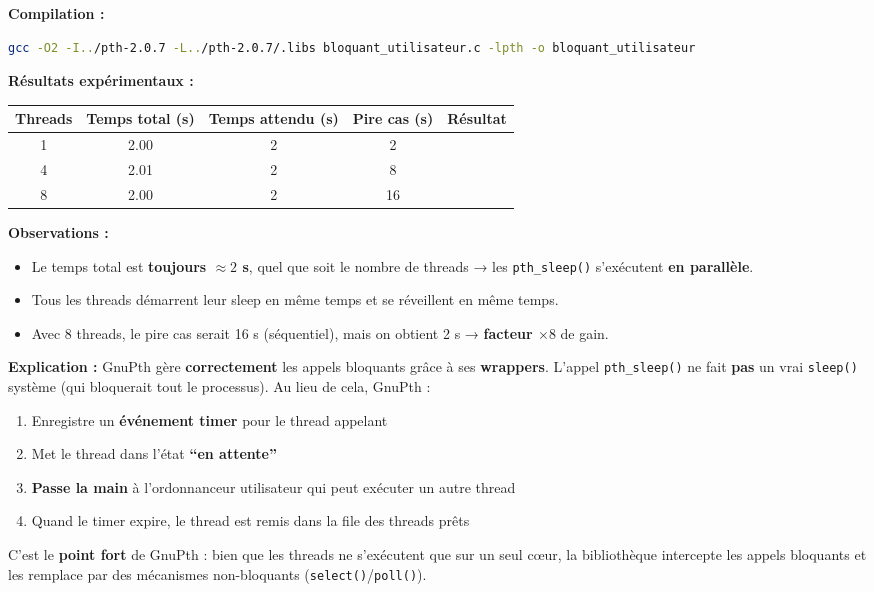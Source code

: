 \documentclass[11pt,a4paper]{article}
\newcommand{\cmark}{\ding{51}}
\let\oldtexttt\texttt
\renewcommand{\texttt}[1]{\oldtexttt{\color{keyword}#1}}
\begin{document}
\textbf{Compilation :}
\begin{lstlisting}[language=bash]
gcc -O2 -I../pth-2.0.7 -L../pth-2.0.7/.libs bloquant_utilisateur.c -lpth -o bloquant_utilisateur
\end{lstlisting}

\textbf{Résultats expérimentaux :}
\begin{center}
\begin{tabular}{|c|c|c|c|c|}
\hline
\textbf{Threads} & \textbf{Temps total (s)} & \textbf{Temps attendu (s)} & \textbf{Pire cas (s)} & \textbf{Résultat} \\
\hline
1 & 2.00 & 2 & 2 & \cmark \\
\hline
4 & 2.01 & 2 & 8 & \cmark \\
\hline
8 & 2.00 & 2 & 16 & \cmark \\
\hline
\end{tabular}
\end{center}

\textbf{Observations :}
\begin{itemize}
  \item Le temps total est \textbf{toujours \(\approx 2\) s}, quel que soit le nombre de threads → les \texttt{pth\_sleep()} s'exécutent \textbf{en parallèle}.
  \item Tous les threads démarrent leur sleep en même temps et se réveillent en même temps.
  \item Avec 8 threads, le pire cas serait 16 s (séquentiel), mais on obtient 2 s → \textbf{facteur \(\times 8\)} de gain.
\end{itemize}

\textbf{Explication :} GnuPth gère \textbf{correctement} les appels bloquants grâce à ses \textbf{wrappers}. L'appel \texttt{pth\_sleep()} ne fait \textbf{pas} un vrai \texttt{sleep()} système (qui bloquerait tout le processus). Au lieu de cela, GnuPth :
\begin{enumerate}
  \item Enregistre un \textbf{événement timer} pour le thread appelant
  \item Met le thread dans l'état \textbf{``en attente''}
  \item \textbf{Passe la main} à l'ordonnanceur utilisateur qui peut exécuter un autre thread
  \item Quand le timer expire, le thread est remis dans la file des threads prêts
\end{enumerate}

C'est le \textbf{point fort} de GnuPth : bien que les threads ne s'exécutent que sur un seul cœur, la bibliothèque intercepte les appels bloquants et les remplace par des mécanismes non-bloquants (\texttt{select()}/\texttt{poll()}).
\end{document}
